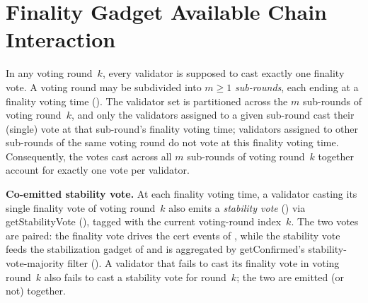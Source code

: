 \ifx\litemode\undefined\documentclass{article}\fi
\newcommand{\getStabilityVote}{\textsf{getStabilityVote}\xspace}
\newcommand{\getConfirmed}{\textsf{getConfirmed}\xspace}
\renewcommand{\paragraph}[1]{\vspace{7pt}\noindent\textbf{#1}}
\theoremstyle{plain}
\theoremstyle{definition}
\theoremstyle{remark}
\begin{document}
\section{Finality Gadget Available Chain Interaction}\label{sec:fg-ac-interaction}

In any voting round~$k$, every validator is supposed to cast exactly one finality vote.
A voting round may be subdivided into $m \geq 1$ \emph{sub-rounds}, each ending at a finality voting time ().
The validator set is partitioned across the $m$ sub-rounds of voting round~$k$, and only the validators assigned to a given sub-round cast their (single) vote at that sub-round's finality voting time; validators assigned to other sub-rounds of the same voting round do not vote at this finality voting time.
Consequently, the votes cast across all $m$ sub-rounds of voting round~$k$ together account for exactly one vote per validator.

\paragraph{Co-emitted stability vote.}
At each finality voting time, a validator casting its single finality vote of voting round~$k$ also emits a \emph{stability vote} () via \getStabilityVote{} (), tagged with the current voting-round index~$k$.
The two votes are paired: the finality vote drives the cert events of , while the stability vote feeds the stabilization gadget of  and is aggregated by \getConfirmed{}'s stability-vote-majority filter ().
A validator that fails to cast its finality vote in voting round~$k$ also fails to cast a stability vote for round~$k$; the two are emitted (or not) together.
\end{document}
